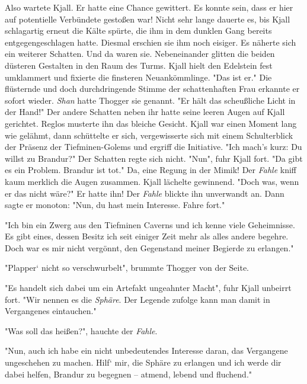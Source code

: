 \documentclass[10pt, a4paper, oneside]{book}
\begin{document}
\begin{multicols}{2}
Also wartete Kjall. Er hatte eine Chance gewittert. Es konnte sein, dass er hier auf potentielle Verbündete gestoßen war! Nicht sehr lange dauerte es, bis Kjall schlagartig erneut die Kälte spürte, die ihm in dem dunklen Gang bereits entgegengeschlagen hatte. Diesmal erschien sie ihm noch eisiger. Es näherte sich ein weiterer Schatten. Und da waren sie. Nebeneinander glitten die beiden düsteren Gestalten in den Raum des Turms. Kjall hielt den Edelstein fest umklammert und fixierte die finsteren Neuankömmlinge. "Das ist er." Die flüsternde und doch durchdringende Stimme der schattenhaften Frau erkannte er sofort wieder. \textit{Shan} hatte Thogger sie genannt. "Er hält das scheußliche Licht in der Hand!" Der andere Schatten neben ihr hatte seine leeren Augen auf Kjall gerichtet. Reglos musterte ihn das bleiche Gesicht. Kjall war einen Moment lang wie gelähmt, dann schüttelte er sich, vergewisserte sich mit einem Schulterblick der Präsenz der Tiefminen-Golems und ergriff die Initiative. "Ich mach’s kurz: Du willst zu Brandur?" Der Schatten regte sich nicht. "Nun", fuhr Kjall fort. "Da gibt es ein Problem. Brandur ist tot." Da, eine Regung in der Mimik! Der \textit{Fahle} kniff kaum merklich die Augen zusammen. Kjall lächelte gewinnend. "Doch was, wenn er das nicht wäre?" Er hatte ihn! Der \textit{Fahle} blickte ihn unverwandt an. Dann sagte er monoton: "Nun, du hast mein Interesse. Fahre fort."\bigskip

"Ich bin ein Zwerg aus den Tiefminen Caverns und ich kenne viele Geheimnisse. Es gibt eines, dessen Besitz ich seit einiger Zeit mehr als alles andere begehre. Doch war es mir nicht vergönnt, den Gegenstand meiner Begierde zu erlangen."\bigskip

"Plapper‘ nicht so verschwurbelt", brummte Thogger von der Seite.\bigskip

"Es handelt sich dabei um ein Artefakt ungeahnter Macht", fuhr Kjall unbeirrt fort. "Wir nennen es die \textit{Sphäre}. Der Legende zufolge kann man damit in Vergangenes eintauchen."\bigskip

"Was soll das heißen?", hauchte der \textit{Fahle}.\bigskip

"Nun, auch ich habe ein nicht unbedeutendes Interesse daran, das Vergangene ungeschehen zu machen. Hilf‘ mir, die Sphäre zu erlangen und ich werde dir dabei helfen, Brandur zu begegnen – atmend, lebend und fluchend."\bigskip


\end{multicols}
\end{document}
